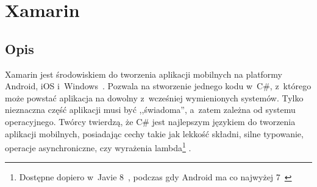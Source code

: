 



\section{Xamarin}
\subsection{Opis}
Xamarin jest środowiskiem do tworzenia aplikacji mobilnych na platformy Android, iOS i~Windows~\cite{xamarin-overview}.
Pozwala na stworzenie jednego kodu w~C\#, z~którego może powstać aplikacja na dowolny z~wcześniej wymienionych systemów. Tylko nieznaczna część aplikacji musi być ,,świadoma'', a~zatem zależna od systemu operacyjnego.
Twórcy twierdzą, że C\# jest najlepszym językiem do tworzenia aplikacji mobilnych, posiadając cechy takie jak lekkość składni, silne typowanie, operacje asynchroniczne, czy wyrażenia lambda\footnote{Dostępne dopiero w~Javie 8~\cite{java-8-features}, podczas gdy Android ma co najwyżej 7~\cite{android-java-7}} .


